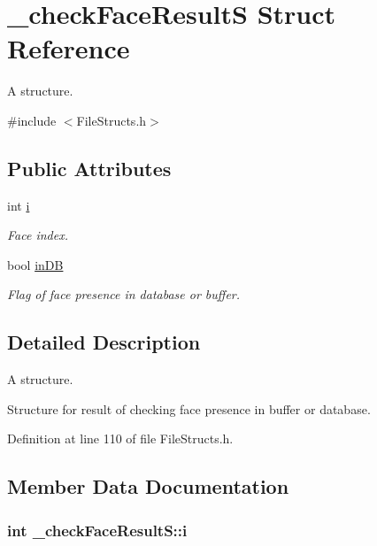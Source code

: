 \hypertarget{struct__check_face_result_s}{}\section{\+\_\+check\+Face\+ResultS Struct Reference}
\label{struct__check_face_result_s}


A structure.  




{\ttfamily \#include $<$File\+Structs.\+h$>$}

\subsection*{Public Attributes}
\begin{DoxyCompactItemize}
\item 
int \hyperlink{struct__check_face_result_s_a016b1da6b53d2a9fe2baf9a88b0699aa}{i}
\begin{DoxyCompactList}\small\item\em Face index. \end{DoxyCompactList}\item 
bool \hyperlink{struct__check_face_result_s_aa7353d6109af6ce0a9b2c8c07e09a48b}{in\+DB}
\begin{DoxyCompactList}\small\item\em Flag of face presence in database or buffer. \end{DoxyCompactList}\end{DoxyCompactItemize}


\subsection{Detailed Description}
A structure. 

Structure for result of checking face presence in buffer or database. 

Definition at line 110 of file File\+Structs.\+h.



\subsection{Member Data Documentation}
\subsubsection[{\texorpdfstring{i}{i}}]{\setlength{\rightskip}{0pt plus 5cm}int \+\_\+check\+Face\+Result\+S\+::i}\hypertarget{struct__check_face_result_s_a016b1da6b53d2a9fe2baf9a88b0699aa}{}\label{struct__check_face_result_s_a016b1da6b53d2a9fe2baf9a88b0699aa}



